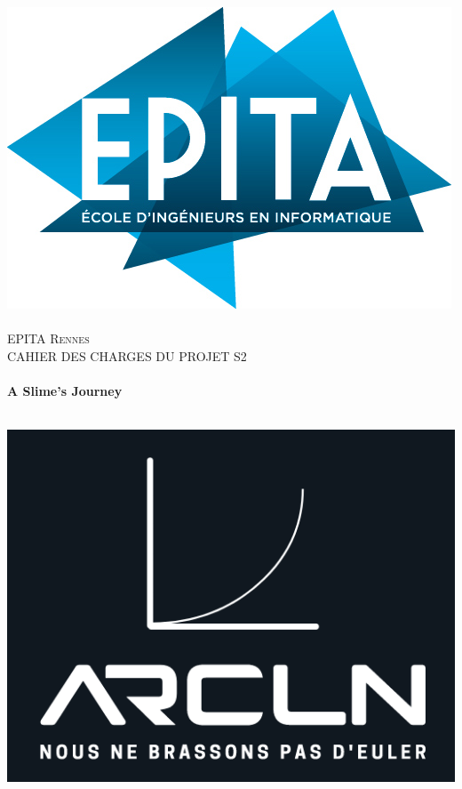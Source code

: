 
\begin{titlepage}
  \begin{sffamily}
  \begin{center}

  
    \includegraphics[scale=0.3]{logo}~\\[1.5cm]

    \textsc{\LARGE EPITA Rennes}\\[0.5cm]

    \textsc{\Large CAHIER DES CHARGES DU PROJET S2}\\[1.5cm]

    \HRule \\[0.4cm]
     { \huge \bfseries  A Slime's Journey \\[0.4cm] }

    \HRule \\[2cm]
    \includegraphics[scale=0.4]{arcln}
     \\[0.5cm]


\end{center}
\end{sffamily}
\end{titlepage}
